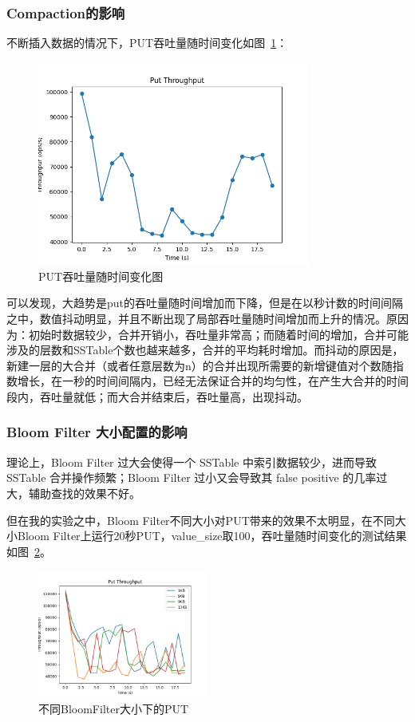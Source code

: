 \documentclass[UTF8]{article}
\begin{document}
\subsubsection{Compaction的影响}
不断插入数据的情况下，PUT吞吐量随时间变化如图~\ref{fig:PUT吞吐量随时间变化图}：
\begin{figure}[h]
    \centering
    \includegraphics[width=0.8\textwidth]{../imgs/put_plot_test/put_plot_8KB.png}
    \caption{PUT吞吐量随时间变化图}\label{fig:PUT吞吐量随时间变化图}
\end{figure}
可以发现，大趋势是put的吞吐量随时间增加而下降，但是在以秒计数的时间间隔之中，数值抖动明显，并且不断出现了局部吞吐量随时间增加而上升的情况。原因为：初始时数据较少，合并开销小，吞吐量非常高；而随着时间的增加，合并可能涉及的层数和SSTable个数也越来越多，合并的平均耗时增加。而抖动的原因是，新建一层的大合并（或者任意层数为n）的合并出现所需要的新增键值对个数随指数增长，在一秒的时间间隔内，已经无法保证合并的均匀性，在产生大合并的时间段内，吞吐量就低；而大合并结束后，吞吐量高，出现抖动。



\subsubsection{Bloom Filter 大小配置的影响}
理论上，Bloom Filter 过大会使得一个 SSTable 中索引数据较少，进而导致 SSTable 合并操作频繁；Bloom Filter 过小又会导致其 false positive 的几率过大，辅助查找的效果不好。

但在我的实验之中，Bloom Filter不同大小对PUT带来的效果不太明显，在不同大小Bloom Filter上运行20秒PUT，value\_size取100，吞吐量随时间变化的测试结果如图~\ref{fig:不同BloomFilter大小下的PUT}。

\begin{figure}[ht]
    \centering
    \includegraphics[width=0.5\textwidth]{../imgs/put_plot_test/comparison.png}
    \caption{不同BloomFilter大小下的PUT}\label{fig:不同BloomFilter大小下的PUT}
\end{figure}
\end{document}
